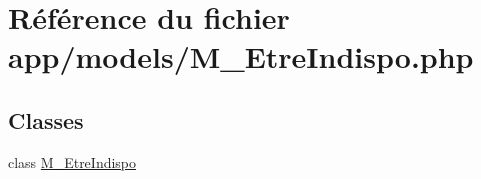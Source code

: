 \hypertarget{_m___etre_indispo_8php}{}\section{Référence du fichier app/models/\+M\+\_\+\+Etre\+Indispo.php}
\label{_m___etre_indispo_8php}
\subsection*{Classes}
\begin{DoxyCompactItemize}
\item 
class \hyperlink{class_m___etre_indispo}{M\+\_\+\+Etre\+Indispo}
\end{DoxyCompactItemize}
